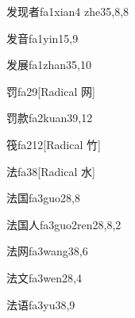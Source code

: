 \begin{verbete}{发现者}{fa1xian4 zhe3}{5,8,8}
\end{verbete}

\begin{verbete}{发音}{fa1yin1}{5,9}
\end{verbete}

\begin{verbete}{发展}{fa1zhan3}{5,10}
\end{verbete}

\begin{verbete}{罚}{fa2}{9}[Radical 网]
\end{verbete}

\begin{verbete}{罚款}{fa2kuan3}{9,12}
\end{verbete}

\begin{verbete}{筏}{fa2}{12}[Radical 竹]
\end{verbete}

\begin{verbete}{法}{fa3}{8}[Radical 水]
\end{verbete}

\begin{verbete}{法国}{fa3guo2}{8,8}
\end{verbete}

\begin{verbete}{法国人}{fa3guo2ren2}{8,8,2}
\end{verbete}

\begin{verbete}{法网}{fa3wang3}{8,6}
\end{verbete}

\begin{verbete}{法文}{fa3wen2}{8,4}
\end{verbete}

\begin{verbete}{法语}{fa3yu3}{8,9}
\end{verbete}

